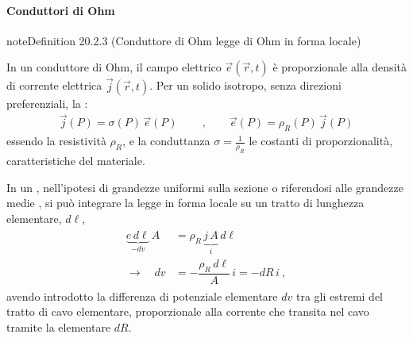 \documentclass[letterpaper,10pt,italian]{jupyterBook}
\begin{document}
\paragraph{Conduttori di Ohm}
\label{\detokenize{ch/electromagnetism/electric-current:conduttori-di-ohm}}\label{\detokenize{ch/electromagnetism/electric-current:physics-hs-electromagnetism-electric-current-solids-conductor-ohm}}\label{ch/electromagnetism/electric-current:definition-2}
\begin{sphinxadmonition}{note}{Definition 20.2.3 (Conduttore di Ohm \sphinxhyphen{} legge di Ohm in forma locale)}



\sphinxAtStartPar
In un conduttore di Ohm, il campo elettrico \(\vec{e}(\vec{r},t)\) è proporzionale alla densità di corrente elettrica \(\vec{j}(\vec{r},t)\). Per un solido isotropo, senza direzioni preferenziali, la :
\begin{equation}\label{equation:ch/electromagnetism/electric-current:ohm:local}
\begin{split}
\vec{j}(P) = \sigma(P) \, \vec{e}(P)
\qquad \ , \qquad
\vec{e}(P) = \rho_R(P) \, \vec{j}(P)
\end{split}
\end{equation}
\sphinxAtStartPar
essendo la resistività \(\rho_R\), e la conduttanza \(\sigma = \frac{1}{\rho_R}\) le costanti di proporzionalità, caratteristiche del materiale.
\end{sphinxadmonition}

\sphinxAtStartPar
In un {\hyperref[\detokenize{ch/electromagnetism/electric-current:electric-current-cable}]{}}, nell’ipotesi di grandezze uniformi sulla sezione \sphinxhyphen{} o riferendosi alle grandezze medie \sphinxhyphen{}, si può integrare la legge in forma locale su un tratto di lunghezza elementare, \(d \ell\),
\begin{equation*}
\begin{split}\begin{aligned}
 \underbrace{e \, d \ell}_{- d v} \, A & = \rho_R \, \underbrace{j \, A}_{i} \, d \ell \\
 \rightarrow \quad dv & = - \dfrac{\rho_R \, d \ell}{A} \, i = - dR \, i \ , 
\end{aligned}\end{split}
\end{equation*}
\sphinxAtStartPar
avendo introdotto la differenza di potenziale elementare \(d v\) tra gli estremi del tratto di cavo elementare, proporzionale alla corrente che transita nel cavo tramite la  elementare \(dR\).
\end{document}
